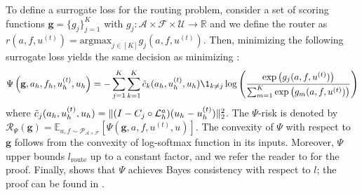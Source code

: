 \documentclass{article} %
\begin{document}
To define a surrogate loss for the routing problem, consider a set of scoring functions $\mathbf{g} =\{g_j\}_{j = 1}^K$ with $g_j: \mathcal{A} \times \mathcal{F} \times \mathcal{U} \to \mathbb{R}$ and we define the router as $r(a, f, u^{(t)}) = \text{argmax}_{j \in [K]} g_j(a, f, u^{(t)})$. Then, minimizing the following surrogate loss yields the same decision as minimizing :
\begin{equation} \label{eq:routersurrogate}
    \Psi\left(\mathbf{g}, a_h, f_h, u^{(t)}_h, u_h\right) = -\sum_{j = 1}^K \sum_{k = 1}^K\Tilde{c}_k(a_h, u^{(t)}_h, u_h)\1_{k\neq j}\log\left(\frac{\exp\left(g_j(a, f, u^{(t)})\right)}{\sum_{m = 1}^K\exp\left(g_m(a, f, u^{(t)})\right)}\right)
\end{equation}
where $\Tilde{c}_j(a_h, u^{(t)}_h, u_h) = \|( I - C_{j} \circ \mathcal{L}_{h}^a)(u_h - u^{(t)}_h)\|^2_2$.
The $\Psi$-risk is denoted by $\mathcal{R}_{\Psi}(\mathbf{g}) = \mathbb{E}_{a, f \sim \mathcal{P}_{\mathcal{A} \times \mathcal{F}}}[\Psi(\mathbf{g}, a, f, u^{(t)}, u)]$. The convexity of $\Psi$ with respect to $\mathbf{g}$ follows from the convexity of log-softmax function in its inputs. Moreover, $\Psi$ upper bounds $l_{\text{route}}$ up to a constant factor, and we refer the reader to  for the proof. Finally,  shows that $\Psi$ achieves Bayes consistency with respect to $l$; the proof can be found in .
\end{document}
